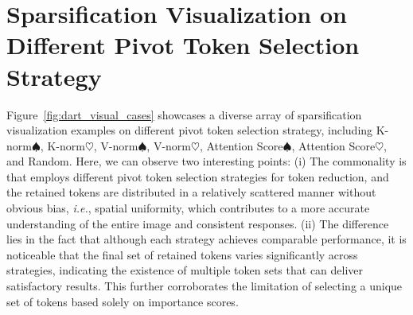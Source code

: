 
\section{Sparsification Visualization on Different Pivot Token Selection Strategy}

Figure~\ref{fig:dart_visual_cases} showcases a diverse array of sparsification visualization examples on different pivot token selection strategy, including K-norm$\spadesuit$, K-norm$\heartsuit$, V-norm$\spadesuit$, V-norm$\heartsuit$, Attention Score$\spadesuit$, Attention Score$\heartsuit$, and Random.
Here, we can observe two interesting points: (i) The commonality is that \algname employs different pivot token selection strategies for token reduction, and the retained tokens are distributed in a relatively scattered manner without obvious bias, \emph{i.e.}, spatial uniformity, which contributes to a more accurate understanding of the entire image and consistent responses. (ii) The difference lies in the fact that although each strategy achieves comparable performance, it is noticeable that the final set of retained tokens varies significantly across strategies, indicating the existence of multiple token sets that can deliver satisfactory results. This further corroborates the limitation of selecting a unique set of tokens based solely on importance scores.





